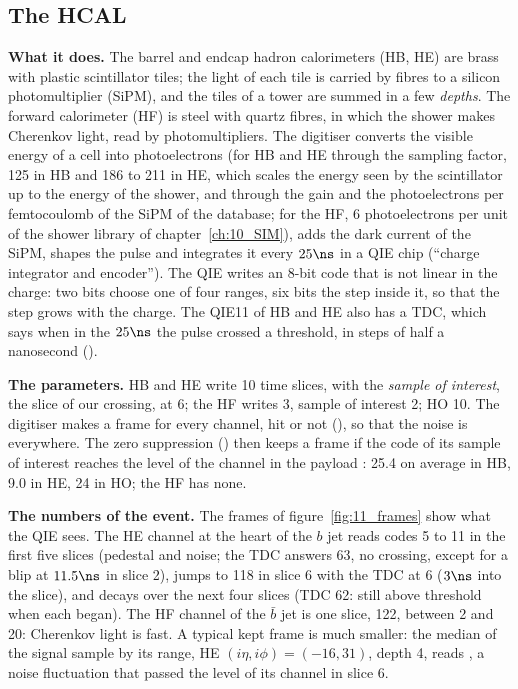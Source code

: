 \subsection{The HCAL}
\label{sec:11_hcal}

\textbf{What it does.} The barrel and endcap hadron calorimeters (HB, HE) are brass with plastic scintillator tiles;
the light of each tile is carried by fibres to a silicon photomultiplier (SiPM), and the tiles of a tower are summed
in a few \emph{depths}. The forward calorimeter (HF) is steel with quartz fibres, in which the shower makes Cherenkov
light, read by photomultipliers. The digitiser converts the visible energy of a cell into photoelectrons (for HB and HE
through the sampling factor, 125 in HB and 186 to 211 in HE, which scales the energy seen by the scintillator up to the
energy of the shower, and through the gain and the photoelectrons per femtocoulomb of the SiPM of the database; for
the HF, 6 photoelectrons per unit of the shower library of chapter~\ref{ch:10_SIM}), adds the dark current of the SiPM,
shapes the pulse and integrates it every $25\ns$ in a QIE chip (``charge integrator and encoder''). The QIE writes an
8-bit code that is not linear in the charge: two bits choose one of four ranges, six bits the step inside it, so that
the step grows with the charge. The QIE11 of HB and HE also has a TDC, which says when in the $25\ns$ the pulse crossed a
threshold, in steps of half a nanosecond ().

\textbf{The parameters.} HB and HE write 10 time slices, with the \emph{sample of interest}, the slice of our
crossing, at 6; the HF writes 3, sample of interest 2; HO 10. The digitiser makes a frame for every channel, hit or not
(), so that the noise is everywhere. The zero suppression () then keeps a
frame if the code of its sample of interest reaches the level of the channel in the payload
: 25.4 on average in HB, 9.0 in HE, 24 in HO; the HF has none.

\textbf{The numbers of the event.} The frames of figure~\ref{fig:11_frames} show what the QIE sees. The HE channel at
the heart of the $b$ jet reads codes 5 to 11 in the first five slices (pedestal and noise; the TDC answers 63, no
crossing, except for a blip at $11.5\ns$ in slice 2), jumps to 118 in slice 6 with the TDC at 6 ($3\ns$ into the slice),
and decays over the next four slices (TDC 62: still above threshold when each began). The HF channel of the
$\bar b$ jet is one slice, 122, between 2 and 20: Cherenkov light is fast. A typical kept frame is much smaller: the
median of the signal sample by its range, HE $(i\eta,i\phi)=(-16,31)$, depth 4, reads ,
a noise fluctuation that passed the level of its channel in slice 6.

